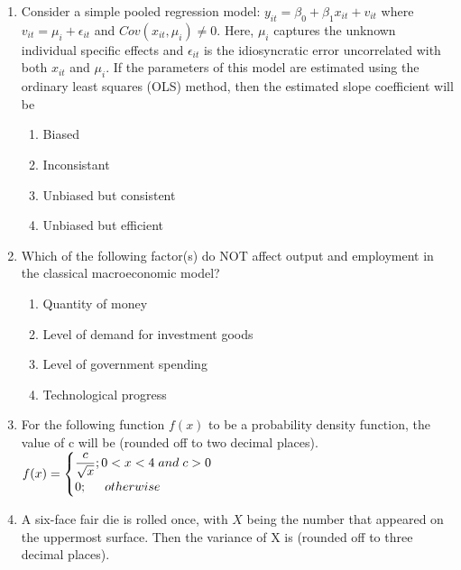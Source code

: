 \documentclass{article}
\begin{document}
\begin{enumerate}[leftmargin=*, start=27, label=Q.\arabic*.]
    \item Consider a simple pooled regression model: $y_{it}=\beta_0+\beta_1x_{it}+v_{it}$ where $v_{it}=\mu_i+\epsilon_{it}$ and $Cov(x_{it},\mu_i)\neq0$. Here, $\mu_i$ captures the unknown individual specific effects and $\epsilon_{it}$ is the idiosyncratic error uncorrelated with both $x_{it}$ and $\mu_i$. If the parameters of this model are estimated using the ordinary least squares (OLS) method, then the estimated slope coefficient will be

    \begin{multicols}{2}
    \begin{enumerate}
        \item Biased
        \item Inconsistant
        \item Unbiased but consistent
        \item Unbiased but efficient
    \end{enumerate}
    \end{multicols}

    \item Which of the following factor(s) do NOT affect output and employment in the classical macroeconomic model?

    \begin{multicols}{2}
    \begin{enumerate}
        \item Quantity of money
        \item Level of demand for investment goods
        \item Level of government spending
        \item Technological progress
    \end{enumerate}
    \end{multicols}

    \item For the following function $f(x)$ to be a probability density function, the value of c will be \makebox[1cm]{\hrulefill} (rounded off to two decimal places).
    $f(x)=\begin{cases}\dfrac{c}{\sqrt{x}};0<x<4 \hspace{0.1cm}and\hspace{0.1cm} c>0 \\ 0;\hspace{0.5cm} otherwise
    \end{cases}$

    \item A six-face fair die is rolled once, with $X$ being the number that appeared on the uppermost surface. Then the variance of X is \makebox[1cm]{\hrulefill} (rounded off to three decimal places).


\end{enumerate}
\end{document}
